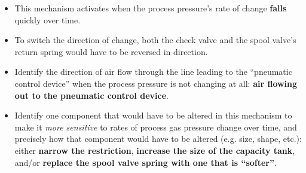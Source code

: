 





\begin{itemize}
\item{} This mechanism activates when the process pressure's rate of change {\bf falls} quickly over time.
\vskip 10pt 
\item{} To switch the direction of change, both the check valve and the spool valve's return spring would have to be reversed in direction.
\vskip 10pt 
\item{} Identify the direction of air flow through the line leading to the ``pneumatic control device'' when the process pressure is not changing at all: {\bf air flowing out to the pneumatic control device}.
\vskip 10pt 
\item{} Identify one component that would have to be altered in this mechanism to make it {\it more sensitive} to rates of process gas pressure change over time, and precisely how that component would have to be altered (e.g. size, shape, etc.): either {\bf narrow the restriction}, {\bf increase the size of the capacity tank}, and/or {\bf replace the spool valve spring with one that is ``softer''}.
\end{itemize}











